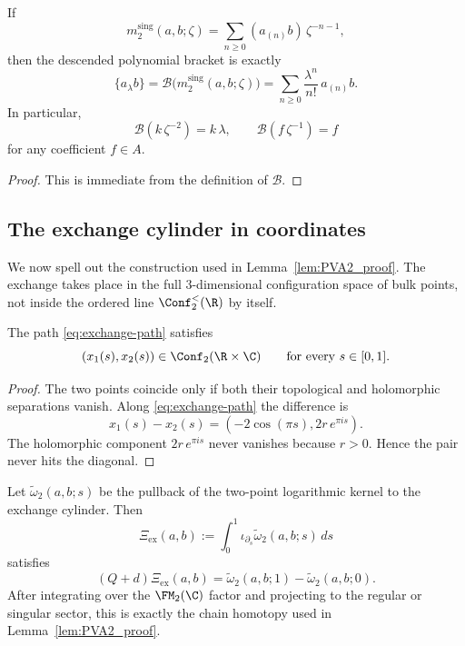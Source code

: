 \begin{lemma}
\label{lem:two-point-dictionary}
If
\[
m_2^{\mathrm{sing}}(a,b;\zeta)=\sum_{n\ge0}(a_{(n)}b)\,\zeta^{-n-1},
\]
then the descended polynomial bracket is exactly
\[
\{a_\lambda b\}=\mathcal B\bigl(m_2^{\mathrm{sing}}(a,b;\zeta)\bigr)
=
\sum_{n\ge0}\frac{\lambda^n}{n!}\,a_{(n)}b.
\]
In particular,
\[
\mathcal B(k\,\zeta^{-2})=k\,\lambda,
\qquad
\mathcal B(f\,\zeta^{-1})=f
\]
for any coefficient $f\in A$.
\end{lemma}

\begin{proof}
This is immediate from the definition of $\mathcal B$.
\end{proof}

\subsection{The exchange cylinder in coordinates}

We now spell out the construction used in
Lemma~\ref{lem:PVA2_proof}.  The exchange takes place in the
full $3$-dimensional configuration space of bulk points, not inside the ordered line
$\Conf_2^{<}(\R)$ by itself.

\begin{proposition}
\label{prop:exchange-path-avoids-diagonal}
The path \eqref{eq:exchange-path} satisfies
\[
(x_1(s),x_2(s))\in \Conf_2(\R\times\C)\qquad\text{for every }s\in[0,1].
\]
\end{proposition}

\begin{proof}
The two points coincide only if both their topological and holomorphic separations vanish.
Along \eqref{eq:exchange-path} the difference is
\[
x_1(s)-x_2(s)=(-2\cos(\pi s),2r\,e^{\pi i s}).
\]
The holomorphic component $2r\,e^{\pi i s}$ never vanishes because $r>0$.
Hence the pair never hits the diagonal.
\end{proof}

\begin{proposition}
\label{prop:cylinder-homotopy-formula}
Let $\widetilde\omega_2(a,b;s)$ be the pullback of the two-point logarithmic kernel to
the exchange cylinder.  Then
\[
\Xi_{\mathrm{ex}}(a,b):=\int_0^1 \iota_{\partial_s}\widetilde\omega_2(a,b;s)\,ds
\]
satisfies
\[
(Q+d)\Xi_{\mathrm{ex}}(a,b)
=
\widetilde\omega_2(a,b;1)-\widetilde\omega_2(a,b;0).
\]
After integrating over the $\FM_2(\C)$ factor and projecting to the regular or singular
sector, this is exactly the chain homotopy used in
Lemma~\ref{lem:PVA2_proof}.
\end{proposition}

